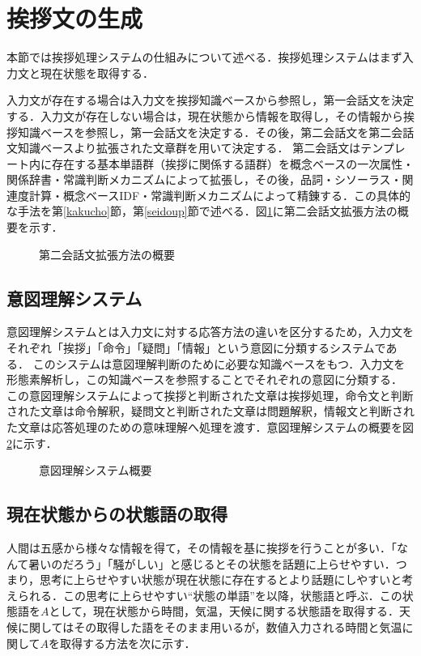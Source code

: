 \section{挨拶文の生成}
本節では挨拶処理システムの仕組みについて述べる．挨拶処理システムはまず入力文と現在状態を取得する．

入力文が存在する場合は入力文を挨拶知識ベースから参照し，第一会話文を決定する．入力文が存在しない場合は，現在状態から情報を取得し，その情報から挨拶知識ベースを参照し，第一会話文を決定する．その後，第二会話文を第二会話文知識ベースより拡張された文章群を用いて決定する．
第二会話文はテンプレート内に存在する基本単語群（挨拶に関係する語群）を概念ベースの一次属性・関係辞書・常識判断メカニズムによって拡張し，その後，品詞・シソーラス・関連度計算・概念ベースIDF・常識判断メカニズムによって精錬する．この具体的な手法を第\ref{kakucho}節，第\ref{seidoup}節で述べる．図\ref{fig:no2kaiwa}に第二会話文拡張方法の概要を示す．
\begin{figure}[htbp]
	\begin{center}
	  	\epsfxsize=9cm
		\caption{第二会話文拡張方法の概要}
		\label{fig:no2kaiwa}
	\end{center}
\end{figure}


\subsection{意図理解システム}
意図理解システムとは入力文に対する応答方法の違いを区分するため，入力文をそれぞれ「挨拶」「命令」「疑問」「情報」という意図に分類するシステム\cite{ooi2002}である．
このシステムは意図理解判断のために必要な知識ベースをもつ．入力文を形態素解析し，この知識ベースを参照することでそれぞれの意図に分類する．
この意図理解システムによって挨拶と判断された文章は挨拶処理，命令文と判断された文章は命令解釈，疑問文と判断された文章は問題解釈，情報文と判断された文章は応答処理のための意味理解へ処理を渡す．意図理解システムの概要を図\ref{fig:itorikaiSystem}に示す．
\begin{figure}[htbp]
	\begin{center}
	  	\epsfxsize=8cm
		\caption{意図理解システム概要}
		\label{fig:itorikaiSystem}
	\end{center}
\end{figure}

\subsection{現在状態からの状態語の取得}
人間は五感から様々な情報を得て，その情報を基に挨拶を行うことが多い．「なんて暑いのだろう」「騒がしい」と感じるとその状態を話題に上らせやすい．つまり，思考に上らせやすい状態が現在状態に存在するとより話題にしやすいと考えられる．この思考に上らせやすい“状態の単語”を以降，状態語と呼ぶ．この状態語を$A$として，現在状態から時間，気温，天候に関する状態語を取得する．天候に関してはその取得した語をそのまま用いるが，数値入力される時間と気温に関して$A$を取得する方法を次に示す． 

